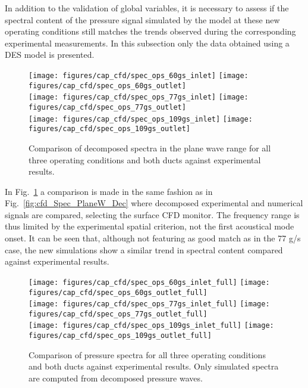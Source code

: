 In addition to the validation of global variables, it is necessary to assess if the spectral content of the pressure signal simulated by the model at these new operating conditions still matches the trends observed during the corresponding experimental measurements. In this subsection only the data obtained using a DES model is presented.

\begin{figure}[htb!]
\centering
\texttt{[image: figures/cap\_cfd/spec\_ops\_60gs\_inlet]}
\texttt{[image: figures/cap\_cfd/spec\_ops\_60gs\_outlet]}\\[4mm]
\texttt{[image: figures/cap\_cfd/spec\_ops\_77gs\_inlet]}
\texttt{[image: figures/cap\_cfd/spec\_ops\_77gs\_outlet]}\\[4mm]
\texttt{[image: figures/cap\_cfd/spec\_ops\_109gs\_inlet]}
\texttt{[image: figures/cap\_cfd/spec\_ops\_109gs\_outlet]}
\caption{Comparison of decomposed spectra in the plane wave range for all three operating conditions and both ducts against experimental results.}
\label{fig:cfd_ops_spec_all_PW}
\end{figure}

In Fig.~\ref{fig:cfd_ops_spec_all_PW} a comparison is made in the same fashion as in Fig.~\ref{fig:cfd_Spec_PlaneW_Dec} where decomposed experimental and numerical signals are compared, selecting the surface CFD monitor. The frequency range is thus limited by the experimental spatial criterion, not the first acoustical mode onset. It can be seen that, although not featuring as good match as in the 77 g/s case, the new simulations show a similar trend in spectral content compared against experimental results. 

\begin{figure}[htb!]
\centering
\texttt{[image: figures/cap\_cfd/spec\_ops\_60gs\_inlet\_full]}
\texttt{[image: figures/cap\_cfd/spec\_ops\_60gs\_outlet\_full]}\\[4mm]
\texttt{[image: figures/cap\_cfd/spec\_ops\_77gs\_inlet\_full]}
\texttt{[image: figures/cap\_cfd/spec\_ops\_77gs\_outlet\_full]}\\[4mm]
\texttt{[image: figures/cap\_cfd/spec\_ops\_109gs\_inlet\_full]}
\texttt{[image: figures/cap\_cfd/spec\_ops\_109gs\_outlet\_full]}
\caption{Comparison of pressure spectra for all three operating conditions and both ducts against experimental results. Only simulated spectra are computed from decomposed pressure waves.}
\label{fig:cfd_ops_spec_all_full}
\end{figure}

